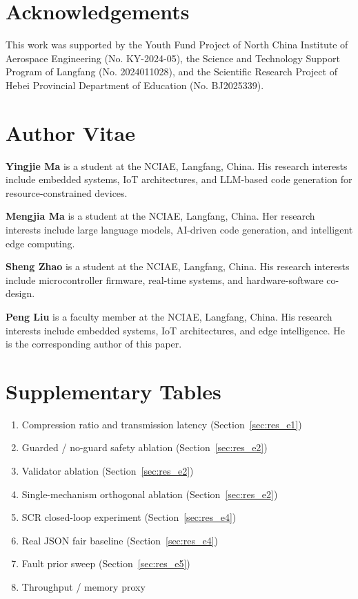 \documentclass[a4paper,fleqn,longmktitle]{cas-dc}
\begin{document}
\section*{Acknowledgements}
This work was supported by the Youth Fund Project of North China Institute of Aerospace Engineering (No. KY-2024-05), the Science and Technology Support Program of Langfang (No. 2024011028), and the Scientific Research Project of Hebei Provincial Department of Education (No. BJ2025339).

\printcredits

\section*{Author Vitae}

\noindent\textbf{Yingjie Ma} is a student at the NCIAE, Langfang, China. His research interests include embedded systems, IoT architectures, and LLM-based code generation for resource-constrained devices.

\noindent\textbf{Mengjia Ma} is a student at the NCIAE, Langfang, China. Her research interests include large language models, AI-driven code generation, and intelligent edge computing.

\noindent\textbf{Sheng Zhao} is a student at the NCIAE, Langfang, China. His research interests include microcontroller firmware, real-time systems, and hardware-software co-design.

\noindent\textbf{Peng Liu} is a faculty member at the NCIAE, Langfang, China. His research interests include embedded systems, IoT architectures, and edge intelligence. He is the corresponding author of this paper.

\appendix

\section{Supplementary Tables}
\label{app:a}

\begin{enumerate}
  \item Compression ratio and transmission latency (Section~\ref{sec:res_e1})
  \item Guarded / no-guard safety ablation (Section~\ref{sec:res_e2})
  \item Validator ablation (Section~\ref{sec:res_e2})
  \item Single-mechanism orthogonal ablation (Section~\ref{sec:res_e2})
  \item SCR closed-loop experiment (Section~\ref{sec:res_e4})
  \item Real JSON fair baseline (Section~\ref{sec:res_e4})
  \item Fault prior sweep (Section~\ref{sec:res_e5})
  \item Throughput / memory proxy
\end{enumerate}
\end{document}
